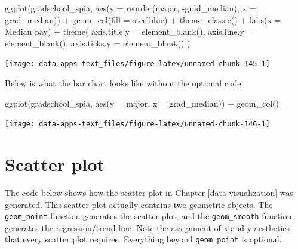 \documentclass[
]{book}
\makeatletter
\newenvironment{Shaded}{\begin{snugshade}}{\end{snugshade}}
\newcommand{\AttributeTok}[1]{\textcolor[rgb]{0.61,0.61,0.61}{#1}}
\newcommand{\FunctionTok}[1]{\textcolor[rgb]{0,0,0}{#1}}
\newcommand{\NormalTok}[1]{#1}
\newcommand{\SpecialCharTok}[1]{\textcolor[rgb]{0,0,0}{#1}}
\newcommand{\StringTok}[1]{\textcolor[rgb]{0.5,0.5,0.5}{#1}}
\newenvironment{kframe}{%
\medskip{}
\setlength{\fboxsep}{.8em}
 \def\at@end@of@kframe{}%
 \ifinner\ifhmode%
  \def\at@end@of@kframe{\end{minipage}}%
  \begin{minipage}{\columnwidth}%
 \fi\fi%
 \def\FrameCommand##1{\hskip\@totalleftmargin \hskip-\fboxsep
 \colorbox{shadecolor}{##1}\hskip-\fboxsep
     \hskip-\linewidth \hskip-\@totalleftmargin \hskip\columnwidth}%
 \MakeFramed {\advance\hsize-\width
   \@totalleftmargin\z@ \linewidth\hsize
   \@setminipage}}%
 {\par\unskip\endMakeFramed%
 \at@end@of@kframe}
\renewenvironment{Shaded}{\begin{kframe}}{\end{kframe}}
\makeatother
\begin{document}
\begin{Shaded}
\begin{Highlighting}[]
\FunctionTok{ggplot}\NormalTok{(gradschool\_spia, }\FunctionTok{aes}\NormalTok{(}\AttributeTok{y =} \FunctionTok{reorder}\NormalTok{(major, }\SpecialCharTok{{-}}\NormalTok{grad\_median), }\AttributeTok{x =}\NormalTok{ grad\_median)) }\SpecialCharTok{+}
  \FunctionTok{geom\_col}\NormalTok{(}\AttributeTok{fill =} \StringTok{\textquotesingle{}steelblue\textquotesingle{}}\NormalTok{) }\SpecialCharTok{+}
  \FunctionTok{theme\_classic}\NormalTok{() }\SpecialCharTok{+}
  \FunctionTok{labs}\NormalTok{(}\AttributeTok{x =} \StringTok{\textquotesingle{}Median pay\textquotesingle{}}\NormalTok{) }\SpecialCharTok{+}
  \FunctionTok{theme}\NormalTok{(}
    \AttributeTok{axis.title.y =} \FunctionTok{element\_blank}\NormalTok{(),}
    \AttributeTok{axis.line.y =} \FunctionTok{element\_blank}\NormalTok{(),}
    \AttributeTok{axis.ticks.y =} \FunctionTok{element\_blank}\NormalTok{()}
\NormalTok{  )}
\end{Highlighting}
\end{Shaded}

\begin{center}\texttt{[image: data-apps-text\_files/figure-latex/unnamed-chunk-145-1]} \end{center}

Below is what the bar chart looks like without the optional code.

\begin{Shaded}
\begin{Highlighting}[]
\FunctionTok{ggplot}\NormalTok{(gradschool\_spia, }\FunctionTok{aes}\NormalTok{(}\AttributeTok{y =}\NormalTok{ major, }\AttributeTok{x =}\NormalTok{ grad\_median)) }\SpecialCharTok{+}
  \FunctionTok{geom\_col}\NormalTok{()}
\end{Highlighting}
\end{Shaded}

\begin{center}\texttt{[image: data-apps-text\_files/figure-latex/unnamed-chunk-146-1]} \end{center}

\hypertarget{scatter-plot}{%
\section{Scatter plot}\label{scatter-plot}}

The code below shows how the scatter plot in Chapter \ref{data-visualization} was generated. This scatter plot actually contains two geometric objects. The \texttt{geom\_point} function generates the scatter plot, and the \texttt{geom\_smooth} function generates the regression/trend line. Note the assignment of x and y aesthetics that every scatter plot requires. Everything beyond \texttt{geom\_point} is optional.
\end{document}
